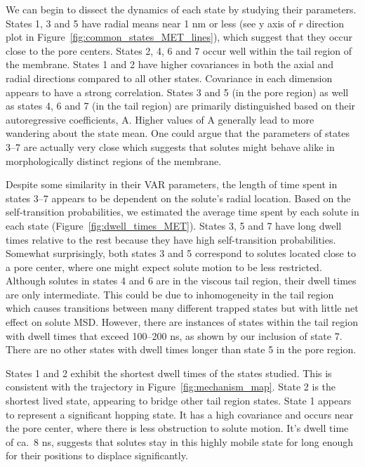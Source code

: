\documentclass[journal=jpcbfk,manuscript=article]{achemso}
\begin{document}
  We can begin to dissect the dynamics of each state by studying their parameters.
  States 1, 3 and 5 have radial means near 1 nm or less (see y axis of $r$ direction 
  plot in Figure~\ref{fig:common_states_MET_lines}), which suggest that they occur
  close to the pore centers. States 2, 4, 6 and 7 occur well within the tail region
  of the membrane. States 1 and 2 have higher covariances in both the axial and radial
  directions compared to all other states. Covariance in each dimension appears to have
  a strong correlation. States 3 and 5 (in the pore region) as well as states 4, 6 and
  7 (in the tail region) are primarily distinguished based on their autoregressive 
  coefficients, A. Higher values of A generally lead to more wandering about the state
  mean. One could argue that the parameters of states 3--7 are actually very close which
  suggests that solutes might behave alike in morphologically distinct regions of the 
  membrane.

  Despite some similarity in their VAR parameters, the length of time spent in states 
  3--7 appears to be dependent on the solute's radial location. Based on the 
  self-transition probabilities, we estimated the average time spent by each solute in
  each state (Figure~\ref{fig:dwell_times_MET}). States 3, 5 and 7 have long dwell times
  relative to the rest because they have high self-transition probabilities. Somewhat 
  surprisingly, both states 3 and 5 correspond to solutes located close to a pore center,
  where one might expect solute motion to be less restricted. Although solutes in states
  4 and 6 are in the viscous tail region, their dwell times are only intermediate. This
  could be due to inhomogeneity in the tail region which causes transitions between many
  different trapped states but with little net effect on solute MSD. However, there are
  instances of states within the tail region with dwell times that exceed 100--200 ns,
  as shown by our inclusion of state 7. There are no other states with dwell times longer
  than state 5 in the pore region.
  
  States 1 and 2 exhibit the shortest dwell times of the states studied. This is 
  consistent with the trajectory in Figure~\ref{fig:mechanism_map}. State 2 is the 
  shortest lived state, appearing to bridge other tail region states. State 1 
  appears to represent a significant hopping state. It has a high covariance and
  occurs near the pore center, where there is less obstruction to solute motion.
  It's dwell time of ca.~8 ns, suggests that solutes stay in this highly mobile 
  state for long enough for their positions to displace significantly.
  
\end{document}
